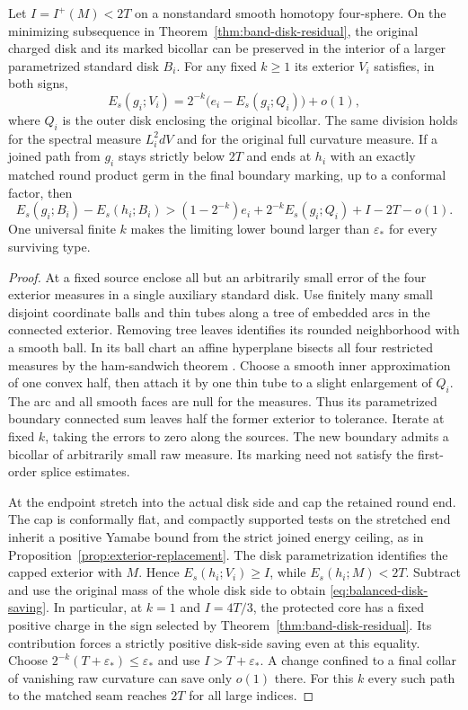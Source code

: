 \begin{proposition}\label{prop:balanced-disk-saving}
Let \(I=I^+(M)<2T\) on a nonstandard smooth homotopy four-sphere.
On the minimizing subsequence in Theorem~\ref{thm:band-disk-residual},
the original charged disk and its marked bicollar can be preserved in
the interior of a larger parametrized standard disk \(B_i\).
For any fixed \(k\ge1\) its exterior \(V_i\) satisfies, in both signs,
\[
 E_s(g_i;V_i)=2^{-k}\bigl(e_i-E_s(g_i;Q_i)\bigr)+o(1),
\]
where \(Q_i\) is the outer disk enclosing the original bicollar.
The same division holds for the spectral measure \(L_i^2dV\)
and for the original full curvature measure.
If a joined path from \(g_i\) stays strictly below \(2T\) and ends at
\(h_i\) with an exactly matched round product germ in the final
boundary marking, up to a conformal factor, then
\begin{equation}\label{eq:balanced-disk-saving}
 E_s(g_i;B_i)-E_s(h_i;B_i)>(1-2^{-k})e_i+2^{-k}E_s(g_i;Q_i)+I-2T-o(1).
\end{equation}
One universal finite \(k\) makes the limiting lower bound larger than
\(\varepsilon_*\) for every surviving type.
\end{proposition}
\begin{proof}
At a fixed source enclose all but an arbitrarily small error of the
four exterior measures in a single auxiliary standard disk. Use
finitely many small disjoint coordinate balls and thin tubes along
a tree of embedded arcs in the connected exterior. Removing tree
leaves identifies its rounded neighborhood with a smooth ball.
In its ball chart an affine hyperplane bisects all four restricted
measures by the ham-sandwich theorem \cite{StoneTukey1942Sandwich}.
Choose a smooth inner approximation of one convex half, then attach
it by one thin tube to a slight enlargement of \(Q_i\). The arc and
all smooth faces are null for the measures. Thus its parametrized
boundary connected sum leaves half the former exterior to tolerance.
Iterate at fixed \(k\), taking the errors to zero along the sources.
The new boundary admits a bicollar of arbitrarily small raw measure.
Its marking need not satisfy the first-order splice estimates.

At the endpoint stretch into the actual disk side and cap the
retained round end. The cap is conformally flat, and compactly
supported tests on the stretched end inherit a positive Yamabe
bound from the strict joined energy ceiling, as in
Proposition~\ref{prop:exterior-replacement}. The disk parametrization
identifies the capped exterior with \(M\). Hence
\(E_s(h_i;V_i)\ge I\), while \(E_s(h_i;M)<2T\).
Subtract and use the original mass of the whole disk side to obtain
\eqref{eq:balanced-disk-saving}. In particular, at \(k=1\) and
\(I=4T/3\), the protected core has a fixed positive charge in the
sign selected by Theorem~\ref{thm:band-disk-residual}. Its contribution
forces a strictly positive disk-side saving even at this equality.
Choose
\(2^{-k}(T+\varepsilon_*)\le\varepsilon_*\) and use
\(I>T+\varepsilon_*\). A change confined to a final collar of
vanishing raw curvature can save only \(o(1)\) there. For this
\(k\) every such path to the matched seam reaches \(2T\) for all
large indices.
\end{proof}


